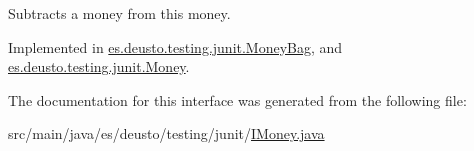 Subtracts a money from this money. 

Implemented in \mbox{\hyperlink{classes_1_1deusto_1_1testing_1_1junit_1_1_money_bag_a7f1803fe267edca895cdf752b5f46560}{es.\+deusto.\+testing.\+junit.\+Money\+Bag}}, and \mbox{\hyperlink{classes_1_1deusto_1_1testing_1_1junit_1_1_money_aada973cd1a31410ed2b7e5d2ae6bc2e9}{es.\+deusto.\+testing.\+junit.\+Money}}.



The documentation for this interface was generated from the following file\+:\begin{DoxyCompactItemize}
\item 
src/main/java/es/deusto/testing/junit/\mbox{\hyperlink{_i_money_8java}{I\+Money.\+java}}\end{DoxyCompactItemize}
